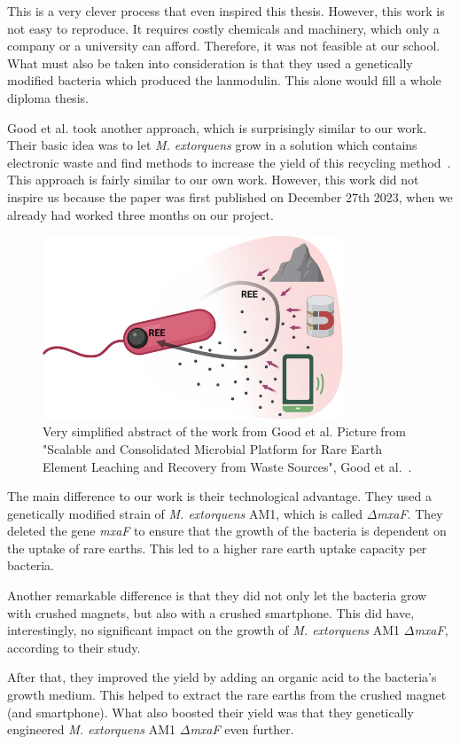 This is a very clever process that even inspired this thesis.
However, this work is not easy to reproduce.
It requires costly chemicals and machinery, which only a company or a university can afford.
Therefore, it was not feasible at our school.
What must also be taken into consideration is that they used a genetically modified bacteria which produced the lanmodulin.
This alone would fill a whole diploma thesis.

\newpage

Good et al. took another approach, which is surprisingly similar to our work.
Their basic idea was to let \emph{M. extorquens} grow in a solution which contains electronic waste and find methods to increase the yield of this recycling method~\cite{similarwork}.
This approach is fairly similar to our own work.
However, this work did not inspire us because the paper was first published on December 27th 2023, when we already had worked three months on our project.

\begin{figure}[H]
    \centering
    \includegraphics[width=0.8\textwidth]{./media/images/similar_work}
    \caption{Very simplified abstract of the work from Good et al.
    Picture from "Scalable and Consolidated Microbial Platform for Rare Earth Element Leaching and Recovery from Waste Sources", Good et al.~\cite{similarwork}.}
    \label{fig:similar_work}
\end{figure}

The main difference to our work is their technological advantage.
They used a genetically modified strain of \emph{M. extorquens} AM1, which is called \(\Delta\)\emph{mxaF}.
They deleted the gene \emph{mxaF} to ensure that the growth of the bacteria is dependent on the uptake of rare earths.
This led to a higher rare earth uptake capacity per bacteria.

Another remarkable difference is that they did not only let the bacteria grow with crushed magnets, but also with a crushed smartphone.
This did have, interestingly, no significant impact on the growth of \emph{M. extorquens} AM1 \(\Delta\)\emph{mxaF}, according to their study.

After that, they improved the yield by adding an organic acid to the bacteria's growth medium.
This helped to extract the rare earths from the crushed magnet (and smartphone).
What also boosted their yield was that they genetically engineered \emph{M. extorquens} AM1 \(\Delta\)\emph{mxaF} even further.
